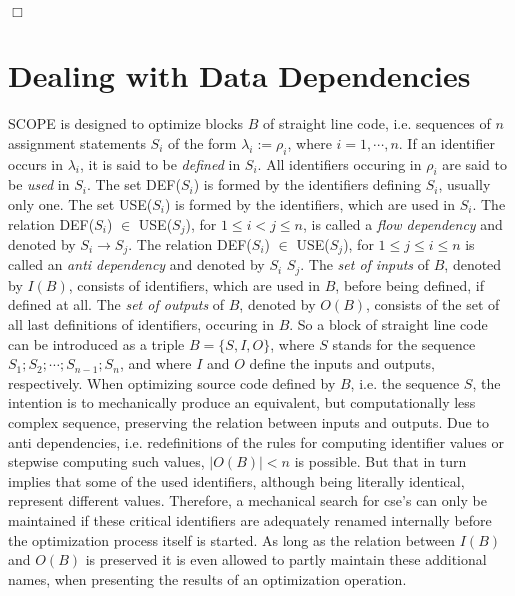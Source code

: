 \begin{flushright}
$\Box$
\end{flushright}
\newpage
\section{Dealing with Data Dependencies}\label{SCOPE:dda}

SCOPE is designed to optimize blocks $B$ of straight line code, i.e.
sequences of $n$ assignment statements $S_i$ of the
form ${\lambda}_i := {\rho}_i$, where $i = 1, \cdots , n$. If an identifier
occurs in ${\lambda}_i$, it is said to be {\em defined} in $S_i$. All
identifiers occuring in ${\rho}_i$ are said to be {\em used} in $S_i$.
The set DEF($S_i$)
is formed by the identifiers defining $S_i$, usually only one.
The set USE($S_i$) is formed by the identifiers, which are used in $S_i$.
The relation DEF($S_i$) $\in$ USE($S_j$), for $1 \leq i < j \leq n$, is
called  a {\em flow dependency} and denoted by $S_i \rightarrow S_j$. The
relation DEF($S_i$) $\in$ USE($S_j$), for $1 \leq j \leq i \leq n$ is called
an {\em anti dependency} and denoted by $S_i$ \ad $S_j$. The {\em set of inputs}
of $B$, denoted by $I(B)$, consists of identifiers, which are used
in $B$, before being defined, if defined at all. The {\em set of outputs} of
$B$, denoted by $O(B)$, consists of the set of all last definitions of
identifiers, occuring in $B$. So a block of straight line code can be
introduced as a triple $B = \{ S, I, O \}$, where $S$ stands for the sequence
$S_1 ; S_2 ; \cdots ; S_{n-1} ; S_n$, and where $I$ and $O$ define the
inputs and outputs, respectively. When optimizing source code defined by $B$,
i.e. the sequence $S$, the intention is to mechanically produce an equivalent,
but computationally less complex sequence, preserving the relation between
inputs and outputs. Due to anti dependencies, i.e. redefinitions of the rules
for computing identifier values or stepwise computing such values,
 $\mid O(B) \mid < n$ is possible.  But that in turn implies that some of the
used identifiers, although being literally identical, represent different
values. Therefore, a mechanical search for cse's can only be maintained if
these critical identifiers are adequately renamed internally before the
optimization process itself is started. As long as the relation between
$I(B)$ and $O(B)$ is preserved it is even allowed to partly maintain these
additional names, when presenting the results of an optimization operation.
